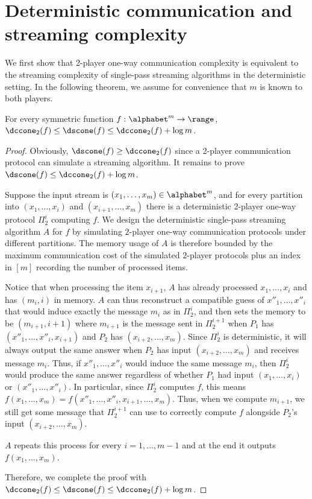 %
%



\section{Deterministic communication and streaming complexity}

We first show that 2-player one-way communication complexity is equivalent to the streaming complexity of single-pass streaming algorithms in the deterministic setting. In the following theorem, we assume for convenience that $m$ is known to both players.

\begin{theorem}\label{thm:dsc-dcc}
For every symmetric function $f:\alphabet^m\to \range$, $\dccone_2(f)\le \dscone(f)\le \dccone_2(f) + \log m$.
\end{theorem}
\begin{proof}
Obviously, $\dscone(f) \ge \dccone_2(f)$ since a 2-player communication protocol can simulate a streaming algorithm.
It remains to prove $\dscone(f) \le \dccone_2(f) + \log m$.

Suppose the input stream is $(x_1,\dots,x_m)\in\alphabet^m$,
and for every partition into $(x_1,\dots, x_i)$ and $(x_{i+1},\dots,x_m)$ there is a deterministic 2-player one-way  protocol $\Pi_2^i$ computing $f$.
We design the deterministic single-pass streaming algorithm $A$ for $f$ by simulating $2$-player one-way communication protocols under different partitions. 
The memory usage of $A$ is therefore bounded by the maximum communication cost of the simulated $2$-player protocols plus an index in $[m]$ recording the number of processed items.

Notice that when processing the item $x_{i+1}$, $A$ has already processed $x_1,\dots, x_i$ and has $(m_i,i)$ in memory. 
$A$ can thus reconstruct a compatible guess of $x''_1,\dots, x''_i$ that would induce exactly the message $m_i$ as in $\Pi_2^i$, and then sets the memory to be $(m_{i+1},i+1)$ where $m_{i+1}$ is the message sent in $\Pi_2^{i+1}$ when $P_1$ has $(x''_1,\dots, x''_i, x_{i+1})$ and $P_2$ has $(x_{i+2},\dots, x_m)$. {\color{black}Since $\Pi_2^i$ is deterministic, it will always output the same answer when $P_2$ has input $(x_{i+2}, \dots, x_m)$ and receives message $m_i$. Thus, if $x''_1, \dots, x''_i$ would induce the same message $m_i$, then $\Pi_2^i$ would produce the same answer regardless of whether $P_1$ had input $(x_1, \dots, x_i)$ or $(x''_1, \dots, x''_i)$. In particular, since $\Pi_2^i$ computes $f$, this means $f(x_1, \dots, x_m) = f(x''_1, \dots, x''_i, x_{i+1}, \dots, x_m)$. Thus, when we compute $m_{i+1}$, we still get some message that $\Pi^{i+1}_2$ can use to correctly compute $f$ alongside $P_2$'s input $(x_{i+2}, \dots, x_m)$.}

$A$ repeats this process for every $i=1,\dots,m-1$ and at the end it outputs $f(x_1,\dots,x_m)$.


Therefore, we complete the proof with $\dccone_2(f)\le \dscone(f) \le \dccone_2(f)+\log m$.
\end{proof}

